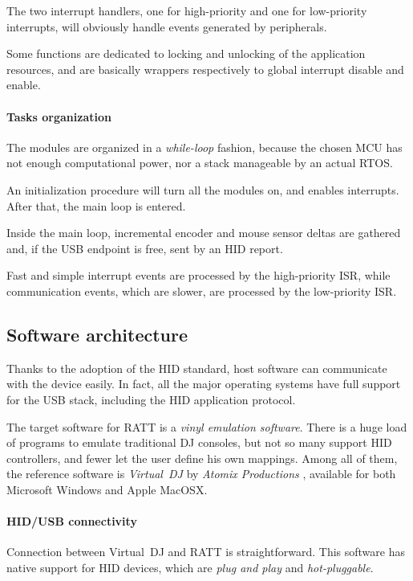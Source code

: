 \documentclass[a4paper,10pt]{article}
\begin{document}
\begin{multicols}{2}
The two interrupt handlers, one for high-priority and one for low-priority
interrupts, will obviously handle events generated by peripherals.

Some functions are dedicated to locking and unlocking of the application
resources, and are basically wrappers respectively to global interrupt disable
and enable.


\paragraph{Tasks organization}
The modules are organized in a \emph{while-loop} fashion, because the chosen
MCU has not enough computational power, nor a stack manageable by an actual
RTOS.

An initialization procedure will turn all the modules on, and enables
interrupts. After that, the main loop is entered.

Inside the main loop, incremental encoder and mouse sensor deltas are gathered
and, if the USB endpoint is free, sent by an HID report.

Fast and simple interrupt events are processed by the high-priority ISR, while
communication events, which are slower, are processed by the low-priority ISR.


\subsection{Software architecture}

Thanks to the adoption of the HID standard, host software can communicate with
the device easily. In fact, all the major operating systems have full support
for the USB stack, including the HID application protocol.

The target software for RATT is a \emph{vinyl emulation software}. There is a
huge load of programs to emulate traditional DJ consoles, but not so many 
support HID controllers, and fewer let the user define his own mappings. Among
all of them, the reference software is \emph{Virtual~DJ} by \emph{Atomix
Productions} \cite{atomix_vdj}, available for both Microsoft Windows and Apple
MacOSX.


\paragraph{HID/USB connectivity}
Connection between Virtual~DJ and RATT is straightforward. This software has
native support for HID devices, which are \emph{plug and play} and
\emph{hot-pluggable}.


\end{multicols}
\end{document}
